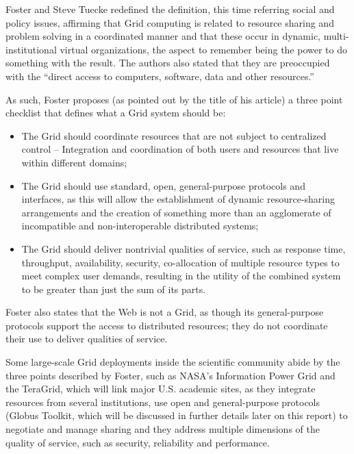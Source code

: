 Foster and Steve Tuecke redefined the definition, this time referring social and policy issues, affirming that Grid computing is related to resource sharing and problem solving in a coordinated manner and that these occur in dynamic, multi-institutional virtual organizations, the aspect to remember being the power to do something with the result. The authors also stated that they are preoccupied with the ``direct access to computers, software, data and other resources.''

As such, Foster proposes (as pointed out by the title of his article) a three point checklist that defines what a Grid system should be:
\begin{itemize}
\item The Grid should coordinate resources that are not subject to centralized control – Integration and coordination of both users and resources that live within different domains;
\item The Grid should use standard, open, general-purpose protocols and interfaces, as this will allow the establishment of dynamic resource-sharing arrangements and the creation of something more than an agglomerate of incompatible and non-interoperable distributed systems;
\item The Grid should deliver nontrivial qualities of service, such as response time, throughput, availability, security, co-allocation of multiple resource types to meet complex user demands, resulting in the utility of the combined system to be greater than just the sum of its parts.
\end{itemize}

Foster also states that the Web is not a Grid, as though its general-purpose protocols support the access to distributed resources; they do not coordinate their use to deliver qualities of service.

Some large-scale Grid deployments inside the scientific community abide by the three points described by Foster, such as NASA’s Information Power Grid and the TeraGrid, which will link major U.S. academic sites, as they integrate resources from several institutions, use open and general-purpose protocols (Globus Toolkit, which will be discussed in further details later on this report) to negotiate and manage sharing and they address multiple dimensions of the quality of service, such as security, reliability and performance.\cite{Foster_2002}

